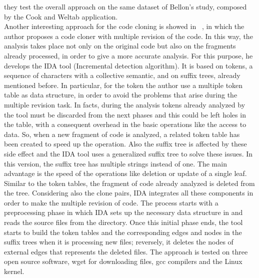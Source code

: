 they test the overall approach on the same dataset of Bellon's study, composed by the Cook and Weltab application. 
\\
Another interesting approach for the code cloning is showed in ~\cite{nils_gode_incremental_2008}, in which the author proposes a code cloner with multiple revision of the code. In this way, the analysis takes place not only on the original code but also on the fragments already processed, in order to give a more accurate analysis. For this purpose, he develops the IDA tool (Incremental detection algorithm). It is based on tokens, a sequence of characters with a collective semantic, and on suffix trees, already mentioned before. In particular, for the token the author use a multiple token table as data structure, in order to avoid the problems that arise during the multiple revision task. In facts, during the analysis tokens already analyzed by the tool must be discarded from the next phases and this could be left holes in the table, with a consequent overhead in the basic operations like the access to data. So, when a new fragment of code is analyzed, a related token table has been created to speed up the operation. Also the suffix tree is affected by these side effect and the IDA tool uses a generalized suffix tree to solve these issues. In this version, the suffix tree has multiple strings instead of one. The main advantage is the speed of the operations like deletion or update of a single leaf. Similar to the token tables, the fragment of code already analyzed is deleted from the tree. Considering also the clone pairs, IDA integrates all these components in order to make the multiple revision of code. The process starts with a preprocessing phase in which IDA sets up the necessary data structure in and reads the source files from the directory. Once this initial phase ends, the tool starts to build the token tables and the corresponding edges and nodes in the suffix trees when it is processing new files; reversely, it deletes the nodes of external edges that represents the deleted files. The approach is tested on three open source software, wget for downloading files, gcc compilers and the Linux kernel. \\
